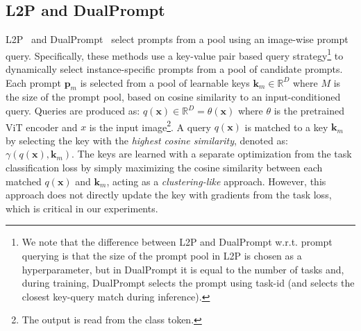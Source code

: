 \subsection{L2P and DualPrompt}
L2P~\cite{wang2022learning} and DualPrompt~\cite{wang2022dualprompt} select prompts from a pool using an image-wise prompt query. Specifically, these methods use a key-value pair based query strategy\footnote{We note that the difference between L2P and DualPrompt w.r.t. prompt querying is that the size of the prompt pool in L2P is chosen as a hyperparameter, but in DualPrompt it is equal to the number of tasks and, during training, DualPrompt selects the prompt using task-id (and selects the closest key-query match during inference).} to dynamically select instance-specific prompts from a pool of candidate prompts. Each prompt $\bm{p}_m$ is selected from a pool of learnable keys $ \bm{k}_m \in \mathbb{R}^{D} $ where $M$ is the size of the prompt pool, based on cosine similarity to an input-conditioned query.
Queries are produced as: $q(\bm{x}) \in \mathbb{R}^{D} = \theta(\bm{x})$ where $\theta$ is the pretrained ViT encoder and $x$ is the input image\footnote{The output is read from the class token.}. A query $q(\bm{x})$ is matched to a key $\bm{k}_m$ by selecting the key with the \emph{highest cosine similarity}, denoted as: $\gamma(q(\bm{x}),\bm{k}_m)$. The keys are learned with a separate optimization from the task classification loss by simply maximizing the cosine similarity between each matched $q(\bm{x})$ and $\bm{k}_m$, acting as a \emph{clustering-like} approach. However, this approach does not directly update the key with gradients from the task loss, which is critical in our experiments.